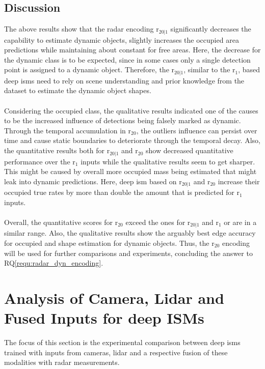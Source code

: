 \subsection{Discussion}
The above results show that the radar encoding \gls{r}$_{20|1}$ significantly decreases the capability to estimate dynamic objects, slightly increases the occupied area predictions while maintaining about constant for free areas. Here, the decrease for the dynamic class is to be expected, since in some cases only a single detection point is assigned to a dynamic object. Therefore, the \gls{r}$_{20|1}$, similar to the \gls{r}$_1$, based deep \gls{ism}s need to rely on scene understanding and prior knowledge from the dataset to estimate the dynamic object shapes. 
\\\\
Considering the occupied class, the qualitative results indicated one of the causes to be the increased influence of detections being falsely marked as dynamic. Through the temporal accumulation in \gls{r}$_{20}$, the outliers influence can persist over time and cause static boundaries to deteriorate through the temporal decay. Also, the quantitative results both for \gls{r}$_{20|1}$ and \gls{r}$_{20}$ show decreased quantitative performance over the \gls{r}$_1$ inputs while the qualitative results seem to get sharper. This might be caused by overall more occupied mass being estimated that might leak into dynamic predictions. Here, deep \gls{ism} based on \gls{r}$_{20|1}$ and \gls{r}$_{20}$ increase their occupied true rates by more than double the amount that is predicted for \gls{r}$_1$ inputs.
\\\\
Overall, the quantitative scores for \gls{r}$_{20}$ exceed the ones for \gls{r}$_{20|1}$ and \gls{r}$_1$ or are in a similar range. Also, the qualitative results show the arguably best edge accuracy for occupied and shape estimation for dynamic objects. Thus, the \gls{r}$_{20}$ encoding will be used for further comparisons and experiments, concluding the answer to RQ\ref{requ:radar_dyn_encoding}.
%
\section{Analysis of Camera, Lidar and Fused Inputs for deep ISMs}
\label{sec:cam_lidar_fusion_in_deep_isms}
The focus of this section is the experimental comparison between deep \gls{ism}s trained with inputs from cameras, lidar and a respective fusion of these modalities with radar measurements.
%
